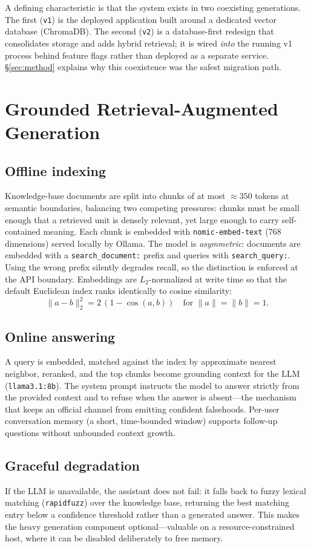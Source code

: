 \documentclass[11pt,letterpaper]{article}
\newcommand{\code}[1]{\texttt{\small #1}}
\begin{document}
A defining characteristic is that the system exists in two coexisting generations. The
first (\code{v1}) is the deployed application built around a dedicated vector database
(ChromaDB). The second (\code{v2}) is a database-first redesign that consolidates
storage and adds hybrid retrieval; it is wired \emph{into} the running v1 process
behind feature flags rather than deployed as a separate service. \S\ref{sec:method}
explains why this coexistence was the safest migration path.

\section{Grounded Retrieval-Augmented Generation}
\label{sec:rag}

\subsection{Offline indexing}
Knowledge-base documents are split into chunks of at most $\approx\!350$ tokens at
semantic boundaries, balancing two competing pressures: chunks must be small enough
that a retrieved unit is densely relevant, yet large enough to carry self-contained
meaning. Each chunk is embedded with \code{nomic-embed-text} (768 dimensions) served
locally by Ollama. The model is \emph{asymmetric}: documents are embedded with a
\code{search\_document:} prefix and queries with \code{search\_query:}. Using the
wrong prefix silently degrades recall, so the distinction is enforced at the API
boundary. Embeddings are $L_2$-normalized at write time so that the default Euclidean
index ranks identically to cosine similarity:
\[
\lVert a - b\rVert_2^2 = 2\,(1 - \cos(a,b)) \quad\text{for } \lVert a\rVert=\lVert b\rVert=1 .
\]

\subsection{Online answering}
A query is embedded, matched against the index by approximate nearest neighbor,
reranked, and the top chunks become grounding context for the LLM
(\code{llama3.1:8b}). The system prompt instructs the model to answer strictly from
the provided context and to refuse when the answer is absent---the mechanism that
keeps an official channel from emitting confident falsehoods. Per-user conversation
memory (a short, time-bounded window) supports follow-up questions without unbounded
context growth.

\subsection{Graceful degradation}
If the LLM is unavailable, the assistant does not fail: it falls back to fuzzy lexical
matching (\code{rapidfuzz}) over the knowledge base, returning the best matching entry
below a confidence threshold rather than a generated answer. This makes the heavy
generation component optional---valuable on a resource-constrained host, where it can
be disabled deliberately to free memory.
\end{document}
